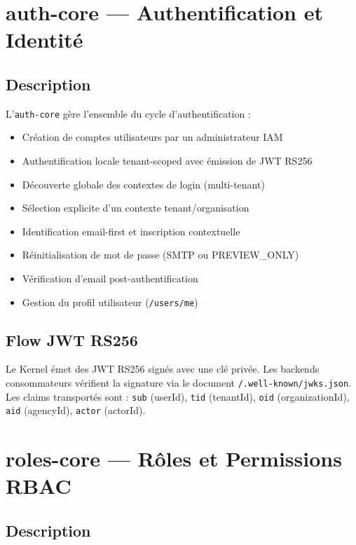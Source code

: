 \documentclass[12pt,a4paper]{report}
\begin{document}
\section{auth-core — Authentification et Identité}

\subsection{Description}

L'\texttt{auth-core} gère l'ensemble du cycle d'authentification :

\begin{itemize}[leftmargin=2cm]
  \item Création de comptes utilisateurs par un administrateur IAM
  \item Authentification locale tenant-scoped avec émission de JWT RS256
  \item Découverte globale des contextes de login (multi-tenant)
  \item Sélection explicite d'un contexte tenant/organisation
  \item Identification email-first et inscription contextuelle
  \item Réinitialisation de mot de passe (SMTP ou PREVIEW\_ONLY)
  \item Vérification d'email post-authentification
  \item Gestion du profil utilisateur (\texttt{/users/me})
\end{itemize}

\subsection{Flow JWT RS256}

Le Kernel émet des JWT RS256 signés avec une clé privée. Les backends consommateurs vérifient la signature via le document \texttt{/.well-known/jwks.json}. Les claims transportés sont : \texttt{sub} (userId), \texttt{tid} (tenantId), \texttt{oid} (organizationId), \texttt{aid} (agencyId), \texttt{actor} (actorId).

\section{roles-core — Rôles et Permissions RBAC}

\subsection{Description}
\end{document}
